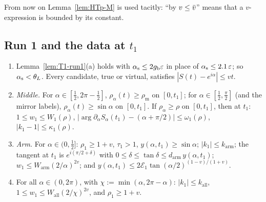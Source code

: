 From now on Lemma~\ref{lem:HTp-M} is used tacitly: ``by $v\le\bar v$'' means that a $v$-expression is bounded by its constant.

\subsection{Run 1 and the data at \texorpdfstring{$t_1$}{t1}}\label{sec:HTp-run1}

\begin{lemma}[Run 1]\label{lem:HTp-run1}
\begin{enumerate}
\item[(a)] Lemma~\ref{lem:T1-run1}(a) holds with $\alpha_{\mathrm s}\le2g_{\mathrm b}\varepsilon$ in place of $\alpha_{\mathrm s}\le2.1\,\varepsilon$; so
$\alpha_{\mathrm s}<\theta_L$. Every candidate, true or virtual, satisfies $|S(t)-e^{i\alpha}|\le vt$.
\item[(b)] \emph{Middle.} For $\alpha\in[\frac12,2\pi-\frac12]$, $\rho_\alpha(t)\ge\rho_{\mathrm m}$ on $[0,t_1]$; for
$\alpha\in[\frac12,\frac\pi2]$ (and the mirror labels), $\rho_\alpha(t)\ge\sin\alpha$ on $[0,t_1]$. If $\rho_\alpha\ge\rho$ on $[0,t_1]$, then
at $t_1$: $1\le w_1\le W_1(\rho)$, $|\arg\partial_\alpha S_\alpha(t_1)-(\alpha+\pi/2)|\le\omega_1(\rho)$, $|k_1-1|\le\kappa_1(\rho)$.
\item[(c)] \emph{Arm.} For $\alpha\in(0,\frac12]$: $\rho_1\ge1+v$, $\tau_1>1$, $y(\alpha,t_1)\ge\sin\alpha$; $|k_1|\le k_{\mathrm{arm}}$; the
tangent at $t_1$ is $e^{i(\pi/2+\delta)}$ with $0\le\delta\le\tan\delta\le d_{\mathrm{arm}}\,y(\alpha,t_1)$;
$w_1\le W_{\mathrm{arm}}(2/\alpha)^{2v}$; and $y(\alpha,t_1)\le2\mathcal E_1\tan(\alpha/2)^{(1-v)/(1+v)}$.
\item[(d)] For all $\alpha\in(0,2\pi)$, with $\chi:=\min(\alpha,2\pi-\alpha)$: $|k_1|\le k_{\mathrm{all}}$,
$1\le w_1\le W_{\mathrm{all}}(2/\chi)^{2v}$, and $\rho_1\ge1+v$.
\end{enumerate}
\end{lemma}
